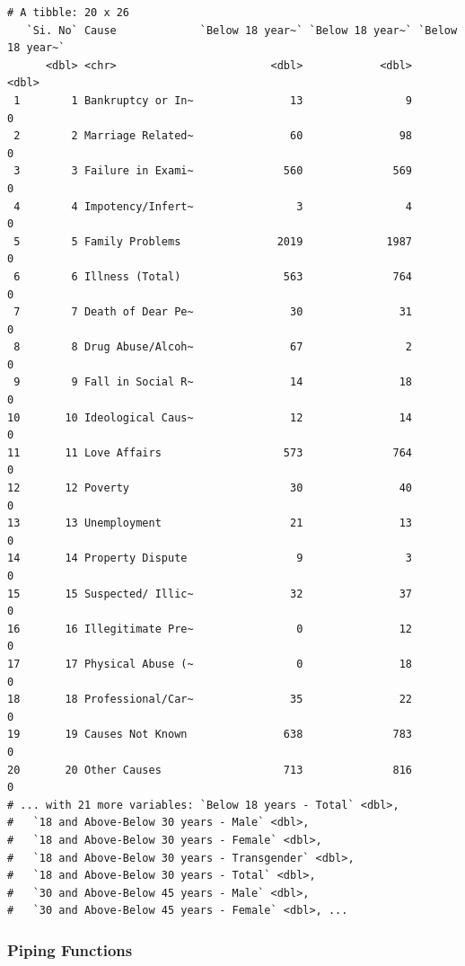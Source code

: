 \documentclass[
  letterpaper,
  DIV=11,
  numbers=noendperiod]{scrartcl}
\begin{document}
\begin{verbatim}
# A tibble: 20 x 26
   `Si. No` Cause             `Below 18 year~` `Below 18 year~` `Below 18 year~`
      <dbl> <chr>                        <dbl>            <dbl>            <dbl>
 1        1 Bankruptcy or In~               13                9                0
 2        2 Marriage Related~               60               98                0
 3        3 Failure in Exami~              560              569                0
 4        4 Impotency/Infert~                3                4                0
 5        5 Family Problems               2019             1987                0
 6        6 Illness (Total)                563              764                0
 7        7 Death of Dear Pe~               30               31                0
 8        8 Drug Abuse/Alcoh~               67                2                0
 9        9 Fall in Social R~               14               18                0
10       10 Ideological Caus~               12               14                0
11       11 Love Affairs                   573              764                0
12       12 Poverty                         30               40                0
13       13 Unemployment                    21               13                0
14       14 Property Dispute                 9                3                0
15       15 Suspected/ Illic~               32               37                0
16       16 Illegitimate Pre~                0               12                0
17       17 Physical Abuse (~                0               18                0
18       18 Professional/Car~               35               22                0
19       19 Causes Not Known               638              783                0
20       20 Other Causes                   713              816                0
# ... with 21 more variables: `Below 18 years - Total` <dbl>,
#   `18 and Above-Below 30 years - Male` <dbl>,
#   `18 and Above-Below 30 years - Female` <dbl>,
#   `18 and Above-Below 30 years - Transgender` <dbl>,
#   `18 and Above-Below 30 years - Total` <dbl>,
#   `30 and Above-Below 45 years - Male` <dbl>,
#   `30 and Above-Below 45 years - Female` <dbl>, ...
\end{verbatim}

\hypertarget{piping-functions}{%
\subsubsection{Piping Functions}\label{piping-functions}}
\end{document}
